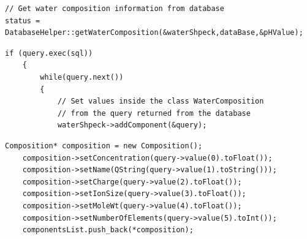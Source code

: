 \begin{minipage}{0.8\linewidth}
\begin{lstlisting}[frame=single, label=cod:waterMethod, caption=Fetching the water composition from the database]
// Get water composition information from database
status = DatabaseHelper::getWaterComposition(&waterShpeck,dataBase,&pHValue);
\end{lstlisting}
\end{minipage}

\begin{minipage}{0.8\linewidth}
\begin{lstlisting}[frame=single, label=cod:waterMethodSaving, caption=Excerpt of the water composition saving code]
    if (query.exec(sql))
    {
        while(query.next())
        {
            // Set values inside the class WaterComposition
            // from the query returned from the database
            waterShpeck->addComponent(&query);
\end{lstlisting}
\end{minipage}

\begin{minipage}{0.8\linewidth}
\begin{lstlisting}[frame=single, label=cod:waterMethodSavingComponent, caption=Detailed composition of the water]
    Composition* composition = new Composition();
    composition->setConcentration(query->value(0).toFloat());
    composition->setName(QString(query->value(1).toString()));
    composition->setCharge(query->value(2).toFloat());
    composition->setIonSize(query->value(3).toFloat());
    composition->setMoleWt(query->value(4).toFloat());
    composition->setNumberOfElements(query->value(5).toInt());
    componentsList.push_back(*composition);
\end{lstlisting}
\end{minipage}

